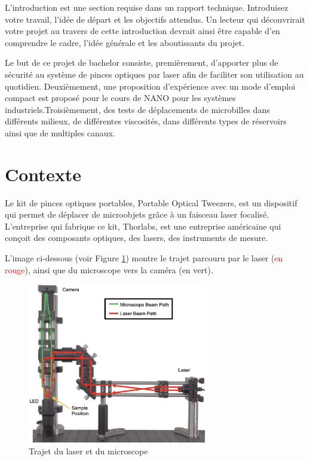 L'introduction est une section requise dans un rapport technique. Introduisez votre travail, l'idée de départ et les objectifs attendus. Un lecteur qui découvrirait votre projet au travers de cette introduction devrait ainsi être capable d'en comprendre le cadre, l'idée générale et les aboutissants du projet.

Le but de ce projet de bachelor consiste, premièrement, d'apporter plus de sécurité au système de pinces optiques par laser afin de faciliter son utilisation au quotidien. Deuxièmement, une proposition d'expérience avec un mode d'emploi compact est proposé pour le cours de NANO pour les systèmes industriels.Troisièmement, des tests de déplacements de microbilles dans différents milieux, de différentes viscosités, dans différents types de réservoirs ainsi que de multiples canaux.
\newpage
\section{Contexte}

Le kit de pinces optiques portables, Portable Optical Tweezers, est un dispositif qui permet de déplacer de microobjets grâce à un faisceau laser focalisé. L'entreprise qui fabrique ce kit, Thorlabs, est une entreprise américaine qui conçoit des composants optiques, des lasers, des instruments de mesure.

L'image ci-dessous (voir Figure \ref{chemin_laser_caméra}) montre le trajet parcouru par le laser (\textcolor{red}{en rouge}), ainsi que du microscope vers la caméra (\textcolor[RGB]{0, 120, 0}{en vert}).

\begin{figure}[H]
    \begin{center}
        \includegraphics[width=0.7\textwidth]{assets/figures/Introduction/chemin_laser_camera.jpeg}
    \end{center}
    \caption{Trajet du laser et du microscope}
    \label{chemin_laser_caméra}
\end{figure}

